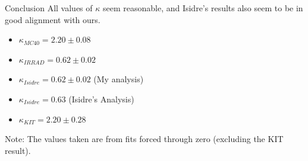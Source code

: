 \documentclass{beamer}
\begin{document}
    \begin{frame}{Conclusion}
    All values of $\kappa$ seem reasonable, and Isidre's results also seem to be in good alignment with ours.
        \begin{itemize}
            \item $\kappa _{MC40} = 2.20 \pm 0.08$
            \item $\kappa _{IRRAD} = 0.62 \pm 0.02$
            \item $\kappa _{Isidre} = 0.62 \pm 0.02$ (My analysis)
            \item $\kappa _{Isidre} = 0.63$ (Isidre's Analysis)
            \item $\kappa _{KIT} = 2.20 \pm 0.28$
        \end{itemize}
    Note: The values taken are from fits forced through zero (excluding the KIT result).
    \end{frame}
\end{document}
